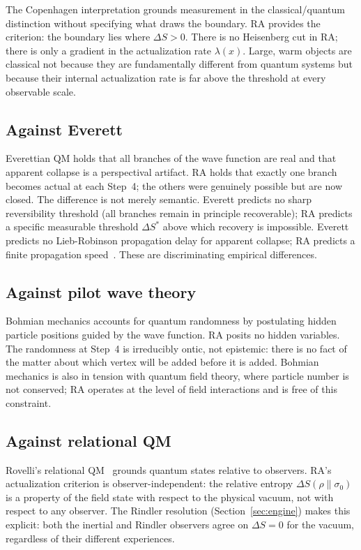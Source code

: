 \documentclass[11pt,twocolumn]{article}
\theoremstyle{plain}
\theoremstyle{remark}
\begin{document}
The Copenhagen interpretation grounds measurement in the classical/quantum
distinction without specifying what draws the boundary.
RA provides the criterion: the boundary lies where $\Delta S > 0$.
There is no Heisenberg cut in RA; there is only a gradient in the
actualization rate $\lambda(x)$.
Large, warm objects are classical not because they are fundamentally
different from quantum systems but because their internal actualization
rate is far above the threshold at every observable scale.

\subsection{Against Everett}

Everettian QM holds that all branches of the wave function are real
and that apparent collapse is a perspectival artifact.
RA holds that exactly one branch becomes actual at each Step~4;
the others were genuinely possible but are now closed.
The difference is not merely semantic.
Everett predicts no sharp reversibility threshold (all branches
remain in principle recoverable); RA predicts a specific measurable
threshold $\Delta S^*$ above which recovery is impossible.
Everett predicts no Lieb-Robinson propagation delay for apparent
collapse; RA predicts a finite propagation speed~\cite{Sandeman2026P2}.
These are discriminating empirical differences.

\subsection{Against pilot wave theory}

Bohmian mechanics accounts for quantum randomness by postulating
hidden particle positions guided by the wave function.
RA posits no hidden variables.
The randomness at Step~4 is irreducibly ontic, not epistemic:
there is no fact of the matter about which vertex will be added
before it is added.
Bohmian mechanics is also in tension with quantum field theory,
where particle number is not conserved; RA operates at the level
of field interactions and is free of this constraint.

\subsection{Against relational QM}

Rovelli's relational QM~\cite{Rovelli1996} grounds quantum
states relative to observers.
RA's actualization criterion is observer-independent: the relative
entropy $\Delta S(\rho\|\sigma_0)$ is a property of the field state
with respect to the physical vacuum, not with respect to any observer.
The Rindler resolution (Section~\ref{sec:engine}) makes this explicit:
both the inertial and Rindler observers agree on $\Delta S = 0$ for
the vacuum, regardless of their different experiences.
\end{document}
